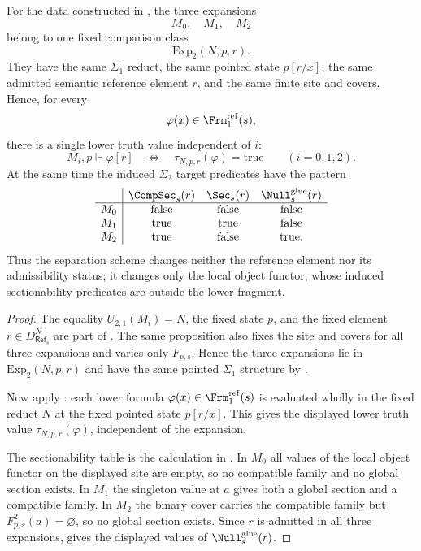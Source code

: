 \begin{lemma}\label{lem:same-reference-fixed-site-separation}
For the data constructed in , the three expansions
\[
M_0,\quad M_1,\quad M_2
\]
belong to one fixed comparison class
\[
\mathrm{Exp}_2(N,p,r).
\]
They have the same $\Sigma_1$ reduct, the same pointed state $p[r/x]$, the same admitted semantic reference element $r$, and the same finite site and covers. Hence, for every
\[
\varphi(x)\in \Frm_1^{\mathrm{ref}}(s),
\]
there is a single lower truth value independent of $i$:
\[
M_i,p\Vdash\varphi[r]
\quad\Longleftrightarrow\quad
\tau_{N,p,r}(\varphi)=\mathrm{true}
\qquad (i=0,1,2).
\]
At the same time the induced $\Sigma_2$ target predicates have the pattern
\[
\begin{array}{c|ccc}
 & \CompSec_s(r) & \Sec_s(r) & \Null^{\mathrm{glue}}_s(r)\\ \hline
M_0 & \text{false} & \text{false} & \text{false}\\
M_1 & \text{true} & \text{true} & \text{false}\\
M_2 & \text{true} & \text{false} & \text{true}.
\end{array}
\]
Thus the separation scheme changes neither the reference element nor its admissibility status; it changes only the local object functor, whose induced sectionability predicates are outside the lower fragment.
\end{lemma}

\begin{proof}
The equality $U_{2,1}(M_i)=N$, the fixed state $p$, and the fixed element $r\in D_{\mathsf{Ref}_s}^N$ are part of . The same proposition also fixes the site and covers for all three expansions and varies only $F_{p,s}$. Hence the three expansions lie in $\mathrm{Exp}_2(N,p,r)$ and have the same pointed $\Sigma_1$ structure by .

Now apply : each lower formula $\varphi(x)\in\Frm_1^{\mathrm{ref}}(s)$ is evaluated wholly in the fixed reduct $N$ at the fixed pointed state $p[r/x]$. This gives the displayed lower truth value $\tau_{N,p,r}(\varphi)$, independent of the expansion.

The sectionability table is the calculation in . In $M_0$ all values of the local object functor on the displayed site are empty, so no compatible family and no global section exists. In $M_1$ the singleton value at $a$ gives both a global section and a compatible family. In $M_2$ the binary cover carries the compatible family but $F^2_{p,s}(a)=\varnothing$, so no global section exists. Since $r$ is admitted in all three expansions,  gives the displayed values of $\Null^{\mathrm{glue}}_s(r)$.
\end{proof}

